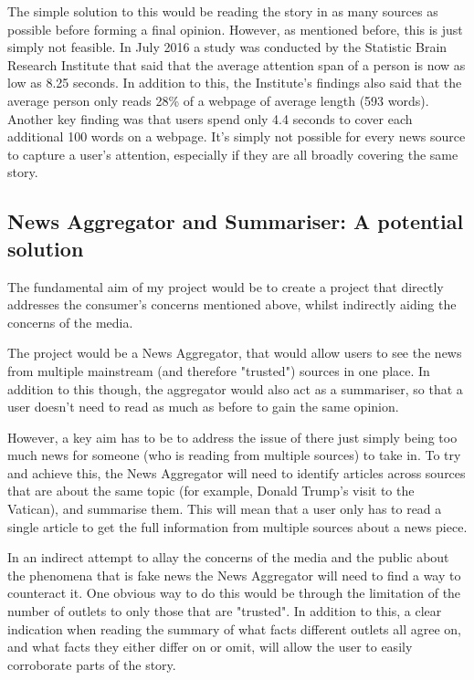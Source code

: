 \documentclass[12pt]{article}
\begin{document}
The simple solution to this would be reading the story in as many sources as possible before forming a final opinion. However, as mentioned before, this is just simply not feasible. In July 2016 a study was conducted by the Statistic Brain Research Institute that said that the average attention span of a person is now as low as 8.25 seconds. In addition to this, the Institute's findings also said that the average person only reads 28\% of a webpage of average length (593 words). Another key finding was that users spend only 4.4 seconds to cover each additional 100 words on a webpage. It's simply not possible for every news source to capture a user's attention, especially if they are all broadly covering the same story.

\subsection{News Aggregator and Summariser: A potential solution}

The fundamental aim of my project would be to create a project that directly addresses the consumer's concerns mentioned above, whilst indirectly aiding the concerns of the media.

The project would be a News Aggregator, that would allow users to see the news from multiple mainstream (and therefore "trusted") sources in one place. In addition to this though, the aggregator would also act as a summariser, so that a user doesn't need to read as much as before to gain the same opinion.

However, a key aim has to be to address the issue of there just simply being too much news for someone (who is reading from multiple sources) to take in. To try and achieve this, the News Aggregator will need to identify articles across sources that are about the same topic (for example, Donald Trump's visit to the Vatican), and summarise them. This will mean that a user only has to read a single article to get the full information from multiple sources about a news piece.

In an indirect attempt to allay the concerns of the media and the public about the phenomena that is fake news the News Aggregator will need to find a way to counteract it. One obvious way to do this would be through the limitation of the number of outlets to only those that are "trusted". In addition to this, a clear indication when reading the summary of what facts different outlets all agree on, and what facts they either differ on or omit, will allow the user to easily corroborate parts of the story.
\end{document}
